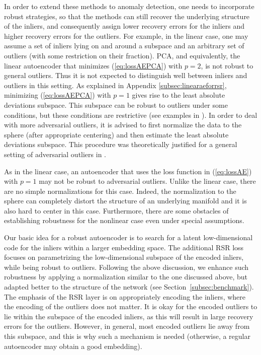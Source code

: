 \documentclass{article} \usepackage{iclr2020_conference,times}
\def\Secref#1{Section~\ref{#1}}
\def\eqref#1{(\ref{#1})}
\begin{document}
In order to extend these methods to anomaly detection, one needs to incorporate robust strategies, so that the methods can still recover the underlying structure of the inliers, and consequently assign lower recovery errors for the inliers and higher recovery errors for the outliers.
For example, in the linear case, one may assume a set of inliers lying on and around a subspace and an arbitrary set of outliers (with some restriction on their fraction). PCA, and equivalently, the linear autoencoder that minimizes \eqref{eq:lossAEPCA} with $p=2$, is not robust to general outliers. Thus it is not expected to distinguish well between inliers and outliers in this setting. As explained in Appendix \ref{subsec:linearaeforrsr}, minimizing \eqref{eq:lossAEPCA} with $p=1$ gives rise to the least absolute deviations subspace. This subspace can be robust to outliers under some conditions, but these conditions are restrictive (see examples in \citet{lp_recovery_part1_11}). In order to deal with more adversarial outliers, it is advised to first normalize the data to the sphere (after appropriate centering) and then estimate the least absolute deviations subspace. This procedure was theoretically justified for a general setting of adversarial outliers in \citet{maunu2019robust}. 


As in the linear case, an autoencoder that uses the loss function in \eqref{eq:lossAE} with $p=1$ may not be robust to adversarial outliers. Unlike the linear case, there are no simple normalizations for this case. Indeed, the normalization to the sphere can completely distort the structure of an underlying manifold and it is also hard to center in this case. Furthermore, there are some obstacles of establishing robustness for the nonlinear case even under special assumptions. 

Our basic idea for a robust autoencoder is to search for a latent low-dimensional code for the inliers within a larger embedding space. The additional RSR loss focuses on parametrizing the low-dimensional subspace of the encoded inliers, while being robust to outliers. 
Following the above discussion, we enhance such robustness by applying a normalization similar to the one discussed above, but adapted better to the structure of the network (see \Secref{subsec:benchmark}). 
The emphasis of the RSR layer is on appropriately encoding the inliers, where the encoding of the outliers does not matter.  It is okay for the encoded outliers to lie within the subspace of the encoded inliers, as this will result in large recovery errors for the outliers. However, in general, most encoded outliers lie away from this subspace, and this is why such a mechanism is needed (otherwise, a regular autoencoder may obtain a good embedding). 
\end{document}
